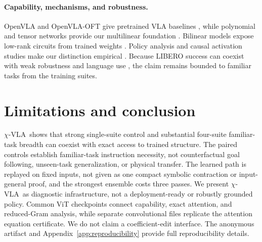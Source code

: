 \documentclass{article}
\newcommand{\chivla}{$\chi$-VLA}
\begin{document}
\paragraph{Capability, mechanisms, and robustness.}
OpenVLA and OpenVLA-OFT give pretrained VLA baselines \cite{openvla,openvlaoft}, while polynomial
and tensor networks provide our multilinear foundation \cite{koldabader,stoudenmire,chrysos}.
Bilinear models expose low-rank circuits from trained weights \cite{pearce,chinets}. Policy analysis
and causal activation studies make our distinction empirical \cite{bimpala,haonsteering,sparsecircuits,causalreduction}.
Because LIBERO success can coexist with weak robustness and language use
\cite{liberopro,liberocf,liberopara}, the claim remains bounded to familiar tasks from the
training suites.

\section{Limitations and conclusion}

\chivla\ shows that strong single-suite control and substantial four-suite familiar-task breadth
can coexist with exact access to trained structure.
The paired controls establish familiar-task instruction necessity, not counterfactual goal following,
unseen-task generalization, or physical transfer. The learned path is replayed on fixed inputs, not
given as one compact symbolic contraction or input-general proof, and the strongest ensemble costs
three passes. We present \chivla\ as diagnostic infrastructure, not a deployment-ready or robustly
grounded policy. Common ViT checkpoints connect capability, exact attention, and reduced-Gram
analysis, while separate convolutional files replicate the attention equation certificate. We do
not claim a coefficient-edit interface. The anonymous artifact and
Appendix~\ref{app:reproducibility} provide full reproducibility details.
\end{document}

